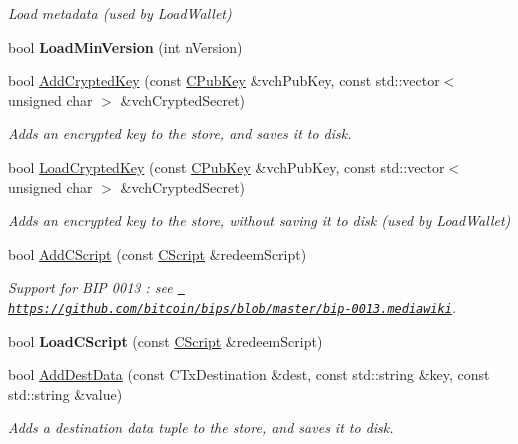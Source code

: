 \begin{DoxyCompactItemize}
\begin{DoxyCompactList}\small\item\em Load metadata (used by Load\+Wallet) \end{DoxyCompactList}\item 
\mbox{\label{class_c_wallet_a88317da8dab80135b8db73e945e15b60}} 
bool {\bfseries Load\+Min\+Version} (int n\+Version)
\item 
bool \mbox{\hyperlink{group__map_wallet_ga3e90096a903d49cd751f05fcdb7692ce}{Add\+Crypted\+Key}} (const \mbox{\hyperlink{class_c_pub_key}{C\+Pub\+Key}} \&vch\+Pub\+Key, const std\+::vector$<$ unsigned char $>$ \&vch\+Crypted\+Secret)
\begin{DoxyCompactList}\small\item\em Adds an encrypted key to the store, and saves it to disk. \end{DoxyCompactList}\item 
bool \mbox{\hyperlink{group__map_wallet_ga01fbd78238d4ef833d059f12a7e8ac9f}{Load\+Crypted\+Key}} (const \mbox{\hyperlink{class_c_pub_key}{C\+Pub\+Key}} \&vch\+Pub\+Key, const std\+::vector$<$ unsigned char $>$ \&vch\+Crypted\+Secret)
\begin{DoxyCompactList}\small\item\em Adds an encrypted key to the store, without saving it to disk (used by Load\+Wallet) \end{DoxyCompactList}\item 
bool \mbox{\hyperlink{group__map_wallet_gad7edacad1c926bc4b7fe0dc1be95ce31}{Add\+C\+Script}} (const \mbox{\hyperlink{class_c_script}{C\+Script}} \&redeem\+Script)
\begin{DoxyCompactList}\small\item\em Support for B\+IP 0013 \+: see \href{https://github.com/bitcoin/bips/blob/master/bip-0013.mediawiki}{\texttt{ https\+://github.\+com/bitcoin/bips/blob/master/bip-\/0013.\+mediawiki}}. \end{DoxyCompactList}\item 
bool {\bfseries Load\+C\+Script} (const \mbox{\hyperlink{class_c_script}{C\+Script}} \&redeem\+Script)
\item 
\mbox{\label{class_c_wallet_acbeae89a10e129930e5059d9167697e5}} 
bool \mbox{\hyperlink{class_c_wallet_acbeae89a10e129930e5059d9167697e5}{Add\+Dest\+Data}} (const C\+Tx\+Destination \&dest, const std\+::string \&key, const std\+::string \&value)
\begin{DoxyCompactList}\small\item\em Adds a destination data tuple to the store, and saves it to disk. \end{DoxyCompactList}\item 

\end{DoxyCompactItemize}
